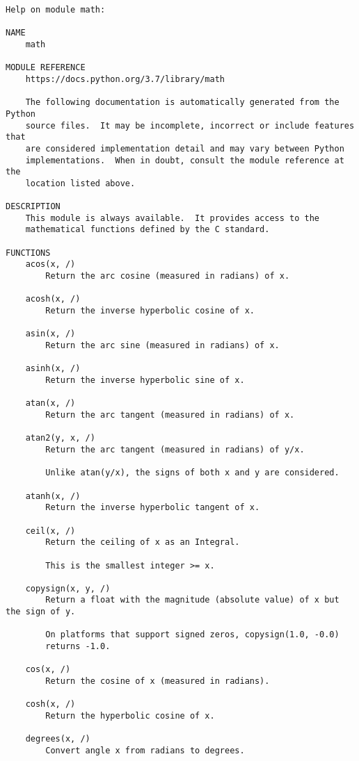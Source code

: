 \documentclass[11pt]{article}
\begin{document}
    \begin{Verbatim}[commandchars=\\\{\}]
Help on module math:

NAME
    math

MODULE REFERENCE
    https://docs.python.org/3.7/library/math
    
    The following documentation is automatically generated from the Python
    source files.  It may be incomplete, incorrect or include features that
    are considered implementation detail and may vary between Python
    implementations.  When in doubt, consult the module reference at the
    location listed above.

DESCRIPTION
    This module is always available.  It provides access to the
    mathematical functions defined by the C standard.

FUNCTIONS
    acos(x, /)
        Return the arc cosine (measured in radians) of x.
    
    acosh(x, /)
        Return the inverse hyperbolic cosine of x.
    
    asin(x, /)
        Return the arc sine (measured in radians) of x.
    
    asinh(x, /)
        Return the inverse hyperbolic sine of x.
    
    atan(x, /)
        Return the arc tangent (measured in radians) of x.
    
    atan2(y, x, /)
        Return the arc tangent (measured in radians) of y/x.
        
        Unlike atan(y/x), the signs of both x and y are considered.
    
    atanh(x, /)
        Return the inverse hyperbolic tangent of x.
    
    ceil(x, /)
        Return the ceiling of x as an Integral.
        
        This is the smallest integer >= x.
    
    copysign(x, y, /)
        Return a float with the magnitude (absolute value) of x but the sign of y.
        
        On platforms that support signed zeros, copysign(1.0, -0.0)
        returns -1.0.
    
    cos(x, /)
        Return the cosine of x (measured in radians).
    
    cosh(x, /)
        Return the hyperbolic cosine of x.
    
    degrees(x, /)
        Convert angle x from radians to degrees.
    

\end{Verbatim}
\end{document}
